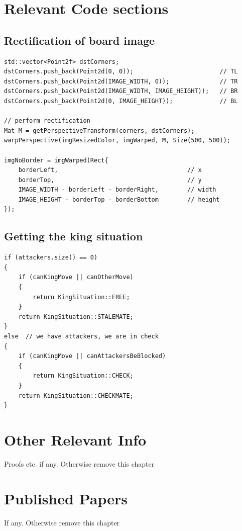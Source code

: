 \appendix
\chapter{Relevant Code sections}
\pagestyle{fancy}

\section{Rectification of board image}  \label{appendix:rectification}
\begin{verbatim}
std::vector<Point2f> dstCorners;
dstCorners.push_back(Point2d(0, 0));                        // TL 
dstCorners.push_back(Point2d(IMAGE_WIDTH, 0));              // TR
dstCorners.push_back(Point2d(IMAGE_WIDTH, IMAGE_HEIGHT));   // BR
dstCorners.push_back(Point2d(0, IMAGE_HEIGHT));             // BL

// perform rectification
Mat M = getPerspectiveTransform(corners, dstCorners);
warpPerspective(imgResizedColor, imgWarped, M, Size(500, 500));

imgNoBorder = imgWarped(Rect{
    borderLeft,                                    // x
    borderTop,                                     // y
    IMAGE_WIDTH - borderLeft - borderRight,        // width
    IMAGE_HEIGHT - borderTop - borderBottom        // height
});
\end{verbatim}


\section{Getting the king situation} \label{appendix:kingsituation}
\begin{verbatim}
if (attackers.size() == 0)
{
    if (canKingMove || canOtherMove)
    {
        return KingSituation::FREE;
    }
    return KingSituation::STALEMATE;
}
else  // we have attackers, we are in check
{
    if (canKingMove || canAttackersBeBlocked)
    {
        return KingSituation::CHECK;
    }
    return KingSituation::CHECKMATE;
}
\end{verbatim}



\chapter{Other Relevant Info}

Proofs etc. if any. Otherwise remove this chapter

\chapter{Published Papers}

If any. Otherwise remove this chapter